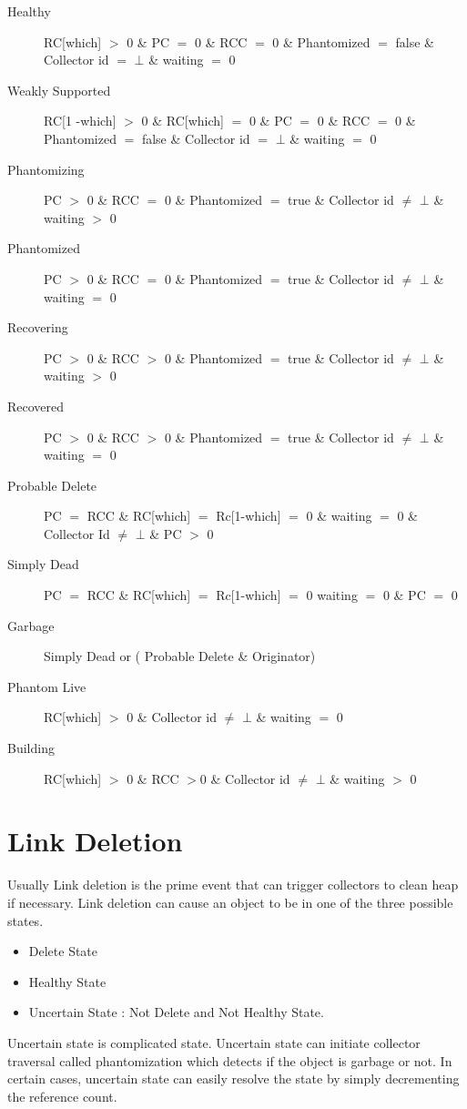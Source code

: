 \documentclass{article}
\begin{document}
\begin{description}
  \item[Healthy] RC[which] $>$ 0 \& PC $=$ 0 \& RCC $=$ 0 \& Phantomized $=$ false \& Collector id $=$ $\bot$ \& waiting $=$ 0
  \item[Weakly Supported] RC[1 -which] $>$ 0 \& RC[which] $=$ 0 \& PC $=$ 0 \& RCC $=$ 0 \& Phantomized $=$ false \& Collector id $=$ $\bot$ \& waiting $=$ 0
  \item[Phantomizing] PC $>$ 0 \& RCC $=$ 0 \& Phantomized $=$ true \& Collector id $\neq$ $\bot$ \& waiting $>$ 0
  \item[Phantomized] PC $>$ 0 \& RCC $=$ 0 \& Phantomized $=$ true \& Collector id $\neq$ $\bot$ \& waiting $=$ 0
   \item[Recovering] PC $>$ 0 \& RCC $>$ 0 \& Phantomized $=$ true \& Collector id $\neq$ $\bot$ \& waiting $>$ 0
   \item[Recovered] PC $>$ 0 \& RCC $>$ 0 \& Phantomized $=$ true \& Collector id $\neq$ $\bot$ \& waiting $=$ 0
  \item[Probable Delete] PC $=$ RCC \& RC[which] $=$ Rc[1-which] $=$ 0 \& waiting $=$ 0 \& Collector Id $\neq$ $\bot$ \& PC $>$ 0
  	\item [Simply Dead] PC $=$ RCC \& RC[which] $=$ Rc[1-which] $=$ 0 waiting $=$ 0 \& PC $=$ 0 
  	\item [Garbage] Simply Dead or  ( Probable Delete \& Originator)
  \item[Phantom Live] RC[which] $>$ 0 \& Collector id $\neq$ $\bot$ \& waiting $=$ 0
   \item[Building] RC[which] $>$ 0 \& RCC $>$0 \& Collector id $\neq$ $\bot$ \& waiting $>$ 0

\end{description}
\section{Link Deletion}
	Usually Link deletion is the prime event that can trigger collectors to clean heap if necessary. Link deletion can cause an object to be in one of the three possible states. 
\begin{itemize}
  \item Delete State
  \item Healthy State
  \item Uncertain State : Not Delete and Not Healthy State.
\end{itemize}
	Uncertain state is complicated state. Uncertain state can initiate collector traversal called phantomization which detects if the object is garbage or not. In certain cases, uncertain state can easily resolve the state by simply decrementing the reference count. 
\end{document}
